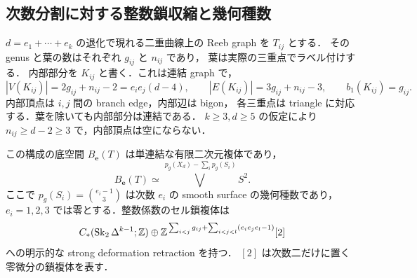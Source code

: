 \subsection{次数分割に対する整数鎖収縮と幾何種数}
\label{part:topology}

$d=e_1+\cdots+e_k$ の退化で現れる二重曲線上の Reeb graph を $T_{ij}$ とする．
その genus と葉の数はそれぞれ $g_{ij}$ と $n_{ij}$ であり，
葉は実際の三重点でラベル付けする．
内部部分を $K_{ij}$ と書く．これは連結 graph で，
\[
 |V(K_{ij})|=2g_{ij}+n_{ij}-2=e_ie_j(d-4),\qquad
 |E(K_{ij})|=3g_{ij}+n_{ij}-3,
 \qquad b_1(K_{ij})=g_{ij}.
\]
内部頂点は $i,j$ 間の branch edge，内部辺は bigon，
各三重点は triangle に対応する．葉を除いても内部部分は連結である．
$k\ge3,d\ge5$ の仮定により $n_{ij}\ge d-2\ge3$ で，内部頂点は空にならない．

\begin{theorem}[次数分割と底空間の整数位相]\label{part:homotopy}
この構成の底空間 $B_{\boldsymbol e}(T)$ は単連結な有限二次元複体であり，
\begin{equation}\label{part:base-wedge}
 B_{\boldsymbol e}(T)\simeq
 \bigvee^{\,p_g(X_d)-\sum_i p_g(S_i)} S^2.
\end{equation}
ここで $p_g(S_i)=\binom{e_i-1}{3}$ は次数 $e_i$ の smooth surface の幾何種数であり，
$e_i=1,2,3$ では零とする．整数係数のセル鎖複体は
\begin{equation}\label{part:chain-target}
 C_*(\operatorname{Sk}_2\Delta^{k-1};\mathbb Z)
 \oplus\mathbb Z^{\,\sum_{i<j}g_{ij}+
                    \sum_{i<j<l}(e_ie_je_l-1)}[2]
\end{equation}
への明示的な strong deformation retraction を持つ．
$[2]$ は次数二だけに置く零微分の鎖複体を表す．
\end{theorem}

